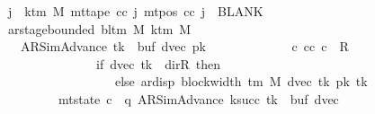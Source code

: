 \begin{isabellebody}
\ \ \ \ \ \ \ \ \ \ \ \ \ {\isasymforall}j\ {\isasymge}\ k{\isacharunderscore}{\kern0pt}tm\ M{\isachardot}{\kern0pt}\ mt{\isacharunderscore}{\kern0pt}tape\ cc\ j\ {\isacharparenleft}{\kern0pt}mt{\isacharunderscore}{\kern0pt}pos\ cc\ j{\isacharparenright}{\kern0pt}\ {\isacharequal}{\kern0pt}\ BLANK{}{\isacharsemicolon}{\kern0pt}\isanewline
\ \ \ \ \ \ \ \ \ \ \ \ \ ar{\isacharunderscore}{\kern0pt}stage{\isacharunderscore}{\kern0pt}bounded\ {\isacharparenleft}{\kern0pt}bl{\isacharunderscore}{\kern0pt}tm\ M{\isacharparenright}{\kern0pt}\ {\isacharparenleft}{\kern0pt}k{\isacharunderscore}{\kern0pt}tm\ M{\isacharparenright}{\kern0pt}\isanewline
\ \ \ \ \ \ \ \ \ \ \ \ \ \ \ {\isacharparenleft}{\kern0pt}AR{\isacharunderscore}{\kern0pt}SimAdvance{\isacharcomma}{\kern0pt}\ tk{\isacharprime}{\kern0pt}{\isacharcomma}{\kern0pt}\ {}{\isacharcomma}{\kern0pt}\ buf{}{\isacharcomma}{\kern0pt}\ dvec{\isacharcomma}{\kern0pt}\ pk{\isacharprime}{\kern0pt}{\isacharparenright}{\kern0pt}\ {\isasymrbrakk}\isanewline
\ \ \ \ \ \ \ \ \ \ \ {\isasymLongrightarrow}\ {\isasymexists}c{\isacharprime}{\kern0pt}{\isachardot}{\kern0pt}\ {\isacharparenleft}{\kern0pt}cc{\isacharcomma}{\kern0pt}\ c{\isacharprime}{\kern0pt}{\isacharparenright}{\kern0pt}\ {\isasymin}\ R{\isacharprime}{\kern0pt}\isanewline
\ \ \ \ \ \ \ \ \ \ \ \ \ \ \ \ \ \ \ \ \ \ \ \ \ \ {\isacharcircum}{\kern0pt}{\isacharcircum}{\kern0pt}\ {\isacharparenleft}{\kern0pt}if\ dvec\ tk{\isacharprime}{\kern0pt}\ {\isacharequal}{\kern0pt}\ dir{\isachardot}{\kern0pt}R\ then\ {}\isanewline
\ \ \ \ \ \ \ \ \ \ \ \ \ \ \ \ \ \ \ \ \ \ \ \ \ \ \ \ \ \ else\ ar{\isacharunderscore}{\kern0pt}disp\ {\isacharparenleft}{\kern0pt}block{\isacharunderscore}{\kern0pt}width\ {\isacharparenleft}{\kern0pt}{\isasymGamma}{\isacharunderscore}{\kern0pt}tm\ M{\isacharparenright}{\kern0pt}{\isacharparenright}{\kern0pt}\ {\isacharparenleft}{\kern0pt}dvec\ tk{\isacharprime}{\kern0pt}{\isacharparenright}{\kern0pt}\ {\isacharparenleft}{\kern0pt}pk{\isacharprime}{\kern0pt}\ tk{\isacharprime}{\kern0pt}{\isacharparenright}{\kern0pt}{\isacharparenright}{\kern0pt}\isanewline
\ \ \ \ \ \ \ \ \ \ \ \ \ \ \ \ \ \ \ \ {\isasymand}\ mt{\isacharunderscore}{\kern0pt}state\ c{\isacharprime}{\kern0pt}\ {\isacharequal}{\kern0pt}\ {\isacharparenleft}{\kern0pt}q{\isacharcomma}{\kern0pt}\ AR{\isacharunderscore}{\kern0pt}SimAdvance{\isacharcomma}{\kern0pt}\ k{\isacharunderscore}{\kern0pt}succ\ tk{\isacharprime}{\kern0pt}{\isacharcomma}{\kern0pt}\ {}{\isacharcomma}{\kern0pt}\ buf{}{\isacharcomma}{\kern0pt}\ dvec{\isacharcomma}{\kern0pt}\isanewline

\end{isabellebody}
